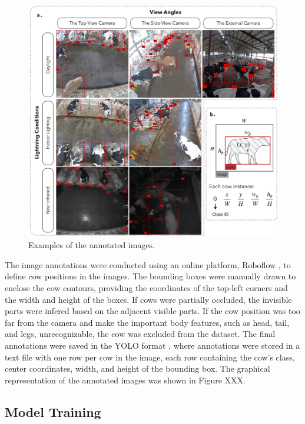 \begin{figure}[h]
    \centering
    \includegraphics[width=1\textwidth]{figure_1.jpg}
    \caption{Examples of the annotated images.}
    \label{fig:dataset}
\end{figure}

The image annotations were conducted using an online platform, Roboflow \citep{}, to define cow positions in the images. The bounding boxes were manually drawn to enclose the cow contours, providing the coordinates of the top-left corners and the width and height of the boxes. If cows were partially occluded, the invisible parts were infered based on the adjacent visible parts. If the cow position was too far from the camera and make the important body features, such as head, tail, and legs, unrecognizable, the cow was excluded from the dataset. The final annotations were saved in the YOLO format \citep{}, where annotations were stored in a text file with one row per cow in the image, each row containing the cow's class, center coordinates, width, and height of the bounding box. The graphical representation of the annotated images was shown in Figure XXX.

\subsection*{Model Training}

